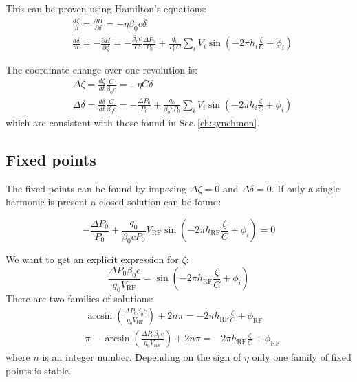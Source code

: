 This can be proven using Hamilton's equations:
\begin{align}
&\frac{d\zeta}{dt} = \frac{\partial H}{\partial \delta} = -\eta \beta_0 c \delta\\
&\frac{d\delta}{dt} = -\frac{\partial H}{\partial \zeta} =
	- \frac{\beta_0 c}{C}\frac{\Delta P_0}{P_0}
                   + \frac{q_0}{P_0 C} \sum_i
                   V_i \sin\left(
                   	-2 \pi h_i \frac{\zeta}{C} + \phi_i \right)
\end{align}

The coordinate change over one revolution is:
\begin{align}
&\Delta \zeta = \frac{d\zeta}{dt}\frac{C}{\beta_0 c}
	= -\eta C \delta\\
&\Delta \delta =\frac{d\delta}{dt} \frac{C}{\beta_0 c}=
	- \frac{\Delta P_0}{P_0}
                   + \frac{q_0}{\beta_0 c P_0} \sum_i
                   V_i \sin\left(
                   	-2 \pi h_i \frac{\zeta}{C} + \phi_i \right)
\end{align}
which are consistent with those found in Sec.\,\ref{ch:synchmon}.

\subsection{Fixed points}

The fixed points can be found by imposing $\Delta\zeta = 0$ and $\Delta\delta = 0$.
If only a single harmonic is present a closed solution can be found:

\begin{equation}
- \frac{\Delta P_0}{P_0}
+ \frac{q_0}{\beta_0 c P_0}
V_\text{RF} \sin\left(
-2 \pi h_\text{RF} \frac{\zeta}{C} + \phi_i \right) = 0
\end{equation}

We want to get an explicit expression for $\zeta$:
\begin{equation}
 \frac{\Delta P_0\beta_0 c }{q_0 V_\text{RF}}
 =
\sin\left(
-2 \pi h_\text{RF} \frac{\zeta}{C} + \phi_i \right)
\end{equation}
There are two families of solutions:
\begin{align}
 &\arcsin\left(\frac{\Delta P_0\beta_0 c }{q_0 V_\text{RF}} \right)
 + 2 n \pi
 =
-2 \pi h_\text{RF} \frac{\zeta}{C} + \phi_\text{RF} \\
 &\pi - \arcsin\left(\frac{\Delta P_0\beta_0 c }{q_0 V_\text{RF}} \right)
 + 2 n \pi
 =
-2 \pi h_\text{RF} \frac{\zeta}{C} + \phi_\text{RF}
\end{align}
where $n$ is an integer number. Depending on the sign of $\eta$ only one family of fixed points is stable.

